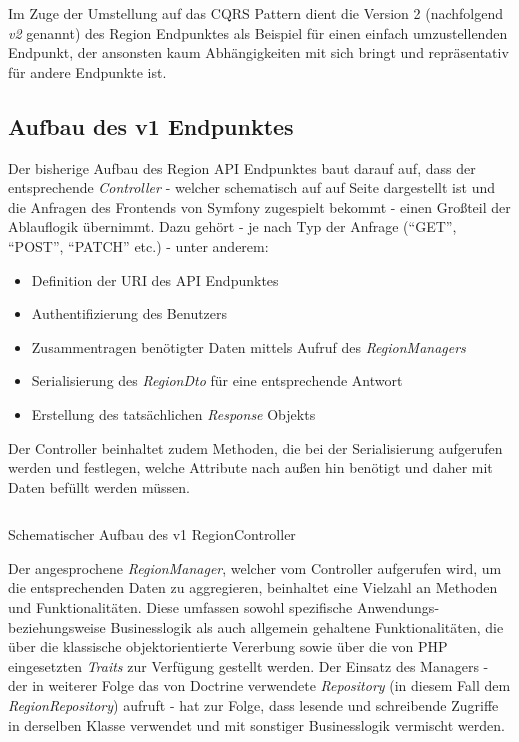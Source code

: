 \documentclass[a4paper,12pt,twoside]{scrreprt}
\begin{document}
\smallskip

Im Zuge der Umstellung auf das CQRS Pattern dient die Version 2 (nachfolgend \textit{v2} genannt) des Region Endpunktes als Beispiel für einen einfach umzustellenden Endpunkt, der ansonsten kaum Abhängigkeiten mit sich bringt und repräsentativ für andere Endpunkte ist.

\subsection{Aufbau des v1 Endpunktes}
\label{sub-sec:region-aufbau-v1}
Der bisherige Aufbau des Region API Endpunktes baut darauf auf, dass der entsprechende \textit{Controller} - welcher schematisch auf auf Seite \pageref{code:region-controller-v1} dargestellt ist und die Anfragen des Frontends von Symfony zugespielt bekommt - einen Großteil der Ablauflogik übernimmt. Dazu gehört - je nach Typ der Anfrage (\enquote{GET}, \enquote{POST}, \enquote{PATCH} etc.) - unter anderem:

\begin{itemize}
    \item Definition der URI des API Endpunktes
    \item Authentifizierung des Benutzers
    \item Zusammentragen benötigter Daten mittels Aufruf des \textit{RegionManagers}
    \item Serialisierung des \textit{RegionDto} für eine entsprechende Antwort
    \item Erstellung des tatsächlichen \textit{Response} Objekts
\end{itemize}

\noindent Der Controller beinhaltet zudem Methoden, die bei der Serialisierung aufgerufen werden und festlegen, welche Attribute nach außen hin benötigt und daher mit Daten befüllt werden müssen.

\begin{listing}[ht]
    \inputminted[fontsize=\footnotesize,linenos,breaklines]{php}{code/region_controller_v1.php}
    \caption[Schematischer Aufbau des v1 RegionController]{Schematischer Aufbau des v1 RegionController}
    \label{code:region-controller-v1}
\end{listing}

Der angesprochene \textit{RegionManager}, welcher vom Controller aufgerufen wird, um die entsprechenden Daten zu aggregieren, beinhaltet eine Vielzahl an Methoden und Funktionalitäten. Diese umfassen sowohl spezifische Anwendungs- beziehungsweise Businesslogik als auch allgemein gehaltene Funktionalitäten, die über die klassische objektorientierte Vererbung sowie über die von PHP eingesetzten \textit{Traits} zur Verfügung gestellt werden. Der Einsatz des Managers - der in weiterer Folge das von Doctrine verwendete \textit{Repository} (in diesem Fall dem \textit{RegionRepository}) aufruft - hat zur Folge, dass lesende und schreibende Zugriffe in derselben Klasse verwendet und mit sonstiger Businesslogik vermischt werden.
\end{document}
